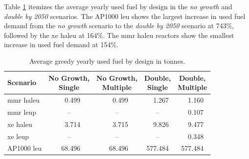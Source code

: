 Table \ref{tab:greedy_used_avg} itemizes the average yearly used fuel by design in the \textit{no growth} and \textit{double by 2050} scenarios. The AP1000 \gls{leu} shows the largest increase in used fuel demand from the \textit{no growth} scenario to the \textit{double by 2050} scenario at 743\%, followed by the \gls{xe} \gls{haleu} at 164\%. The \gls{mmr} \gls{haleu} reactors show the smallest increase in used fuel demand at 154\%.


\begin{table}[H]
  \centering
  \caption{Average greedy yearly used fuel by design in tonnes.}
  \label{tab:greedy_used_avg}
  \begin{tabular}{l c c c c}
     \toprule
     Scenario & \shortstack{No Growth,\\ Single} & \shortstack{No Growth,\\ Multiple} & \shortstack{Double,\\ Single} & \shortstack{Double,\\ Multiple}  \\
     \midrule
     \gls{mmr} \gls{haleu}   & \textcolor{white}{00}0.499    & \textcolor{white}{00}0.499   & \textcolor{white}{00}1.267    & \textcolor{white}{00}1.160    \\
     \gls{mmr} \gls{leup}    & --       & --      & --       & \textcolor{white}{00}0.107    \\
     \gls{xe} \gls{haleu}    & \textcolor{white}{00}3.714    & \textcolor{white}{00}3.715   & \textcolor{white}{00}9.826    & \textcolor{white}{00}9.477    \\
     \gls{xe} \gls{leup}     & --       & --      & --       & \textcolor{white}{00}0.348    \\
     AP1000 \gls{leu}        & \textcolor{white}{0}68.496   & \textcolor{white}{0}68.496  & 577.484  & 577.484  \\
     \hline
  \end{tabular}
\end{table}


